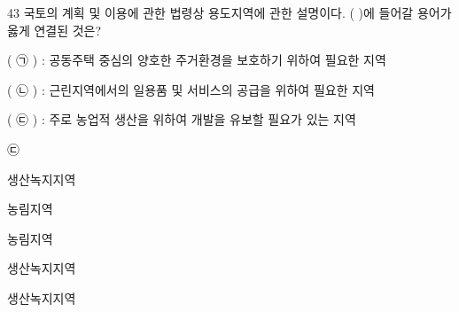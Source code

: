 \begin{question}{43}
국토의 계획 및 이용에 관한 법령상 용도지역에 관한 설명이다. ( )에 들어갈 용어가 옳게 연결된 것은?
\begin{framedtext}
( ㉠ ) : 공동주택 중심의 양호한 주거환경을 보호하기 위하여 필요한 지역 \par
( ㉡ ) : 근린지역에서의 일용품 및 서비스의 공급을 위하여 필요한 지역 \par
( ㉢ ) : 주로 농업적 생산을 위하여 개발을 유보할 필요가 있는 지역 \par
\end{framedtext}
\noindent\hspace*{2em}㉢ \par
\begin{choices}
  \item {}생산녹지지역
  \item {}농림지역
  \item {}농림지역
  \item {}생산녹지지역
  \item {}생산녹지지역
\end{choices}
\end{question}
